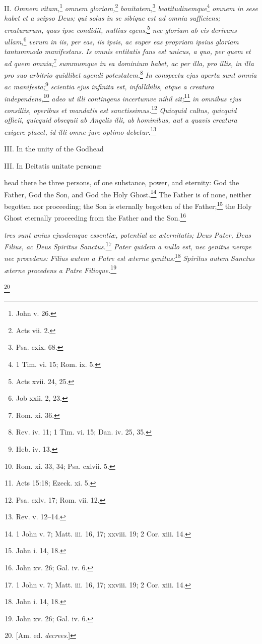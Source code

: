 II. \emph{Omnem vitam,}\footnote{John v. 26.}\emph{ omnem gloriam,}\footnote{Acts vii. 2.}\emph{ bonitatem,}\footnote{Psa. cxix. 68.}\emph{ beatitudinemque}\footnote{1 Tim. vi. 15;  Rom. ix. 5.}\emph{ omnem in sese habet et a seipso Deus; qui solus in se sibique est ad omnia sufficiens; creaturarum, quas ipse condidit, nullius egens,}\footnote{Acts xvii. 24, 25.}\emph{ nec gloriam ab eis derivans ullam,}\footnote{Job xxii. 2, 23.}\emph{ verum in iis, per eas, iis ipsis, ac super eas propriam ipsius gloriam tantummodo manifestans. Is omnis entitatis fans est unicus, a quo, per quem et ad quem omnia;}\footnote{Rom. xi. 36.}\emph{ summumque in ea dominium habet, ac per illa, pro illis, in illa pro suo arbitrio quidlibet agendi potestatem.}\footnote{Rev. iv. 11;  1 Tim. vi. 15; Dan. iv. 25, 35.}\emph{ In conspectu ejus aperta sunt omnia ac manifesta;}\footnote{Heb. iv. 13.}\emph{ scientia ejus infinita est, infallibilis, atque a creatura independens,}\footnote{Rom. xi. 33, 34; Psa. cxlvii. 5.}\emph{ adeo ut illi contingens incertumve nihil sit;}\footnote{Acts 15:18; Ezeck. xi. 5.}\emph{ in omnibus ejus consiliis, operibus et mandatis est sanctissimus.}\footnote{Psa. cxlv. 17;  Rom. vii. 12.}\emph{ Quicquid cultus, quicquid officii, quicquid obsequii ab Angelis illi, ab hominibus, aut a quavis creatura exigere placet, id illi omne jure optimo debetur.}\footnote{Rev. v. 12–14.}

III. In the unity of the Godhead

III. In Deitatis unitate personæ

head there be three persons, of one substance, power, and eternity: God the Father, God the Son, and God the Holy Ghost.\footnote{1 John v. 7; Matt. iii. 16, 17;  xxviii. 19; 2 Cor. xiii. 14.} The Father is of none, neither begotten nor proceeding; the Son is eternally begotten of the Father;\footnote{John i. 14, 18.} the Holy Ghost eternally proceeding from the Father and the Son.\footnote{John xv. 26; Gal. iv. 6.}

\emph{tres sunt unius ejusdemque essentiæ, potential ac æternitatis; Deus Pater, Deus Filius, ac Deus Spiritus Sanctus.}\footnote{1 John v. 7; Matt. iii. 16, 17;  xxviii. 19; 2 Cor. xiii. 14.}\emph{ Pater quidem a nullo est, nec genitus nempe nec procedens: Filius autem a Patre est æterne genitus:}\footnote{John i. 14, 18.}\emph{ Spiritus autem Sanctus æterne procedens a Patre Filioque.}\footnote{John xv. 26; Gal. iv. 6.}

\footnote{[Am. ed. \emph{ decrees}.]}

